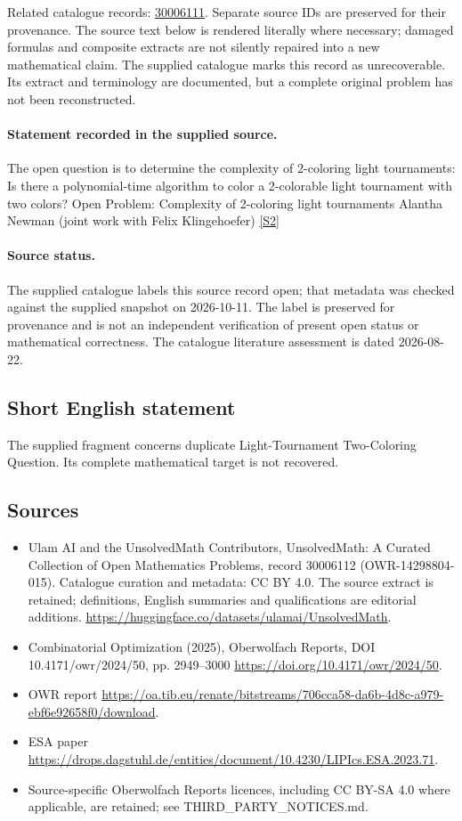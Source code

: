 \documentclass[11pt]{article}
\begin{document}
Related catalogue records: \href{https://mehmetmars7.github.io/Erdosproblems-llm-hunter/problem.html?type=open_problems&id=30006111}{30006111}. Separate source IDs are preserved for their provenance.
The source text below is rendered literally where necessary; damaged formulas and composite extracts are not silently repaired into a new mathematical claim.
The supplied catalogue marks this record as unrecoverable. Its extract and terminology are documented, but a complete original problem has not been reconstructed.
\paragraph{Statement recorded in the supplied source.}
The open question is to determine the complexity of 2-coloring light tournaments: Is there a polynomial-time algorithm to color a 2-colorable light tournament with two colors? Open Problem: Complexity of 2-coloring light tournaments Alantha Newman (joint work with Felix Klingehoefer) \href{https://doi.org/10.4171/owr/2024/50}{[S2]}
\paragraph{Source status.}
The supplied catalogue labels this source record open; that metadata was checked against the supplied snapshot on 2026-10-11. The label is preserved for provenance and is not an independent verification of present open status or mathematical correctness. The catalogue literature assessment is dated 2026-08-22.
\subsection{Short English statement}
The supplied fragment concerns duplicate Light-Tournament Two-Coloring Question. Its complete mathematical target is not recovered.
\subsection{Sources}
\begin{itemize}
\item[S1] Ulam AI and the UnsolvedMath Contributors, UnsolvedMath: A Curated Collection of Open Mathematics Problems, record 30006112 (OWR-14298804-015). Catalogue curation and metadata: CC BY 4.0. The source extract is retained; definitions, English summaries and qualifications are editorial additions.
\url{https://huggingface.co/datasets/ulamai/UnsolvedMath}.
\item[S2] Combinatorial Optimization (2025), Oberwolfach Reports, DOI 10.4171/owr/2024/50, pp. 2949--3000
\url{https://doi.org/10.4171/owr/2024/50}.
\item[S3] OWR report
\url{https://oa.tib.eu/renate/bitstreams/706cca58-da6b-4d8c-a979-ebf6e92658f0/download}.
\item[S4] ESA paper
\url{https://drops.dagstuhl.de/entities/document/10.4230/LIPIcs.ESA.2023.71}.
\item Source-specific Oberwolfach Reports licences, including CC BY-SA 4.0 where applicable, are retained; see THIRD\_PARTY\_NOTICES.md.
\end{itemize}
\end{document}
